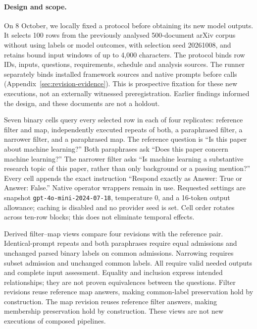 \documentclass[11pt]{article}
\begin{document}
\paragraph{Design and scope.}
On 8 October, we locally fixed a protocol before obtaining its new model
outputs. It selects 100 rows from the previously analysed 500-document
arXiv corpus without using labels or model outcomes, with selection seed
20261008, and retains bound input windows of up to 4,000 characters. The protocol binds
row IDs, inputs, questions, requirements, schedule and analysis sources.
The runner separately binds installed framework sources and native prompts
before calls (Appendix~\ref{sec:revision-evidence}). This is prospective
fixation for these new executions, not an externally witnessed
preregistration. Earlier findings informed the design, and these documents
are not a holdout.

Seven binary cells query every selected row in each of four replicates:
reference filter and map, independently executed repeats of both, a
paraphrased filter, a narrower filter, and a paraphrased map. The reference
question is ``Is this paper about machine learning?'' Both paraphrases ask
``Does this paper concern machine learning?'' The narrower filter asks
``Is machine learning a substantive research topic of this paper, rather
than only background or a passing mention?'' Every cell appends the exact
instruction ``Respond exactly as Answer: True or Answer: False.'' Native
operator wrappers remain in use. Requested settings are snapshot
\texttt{gpt-4o-mini-2024-07-18}, temperature 0, and a 16-token output allowance;
caching is disabled and no provider seed is set. Cell order rotates
across ten-row blocks; this does not eliminate temporal effects.

Derived filter--map views compare four revisions with the reference pair.
Identical-prompt repeats and both paraphrases require equal admissions and
unchanged parsed binary labels on common admissions. Narrowing requires subset
admission and unchanged common labels. All require valid needed outputs and
complete input assessment. Equality and inclusion express intended
relationships; they are not proven equivalences between the questions.
Filter revisions reuse reference map answers, making common-label
preservation hold by construction. The map revision reuses reference filter
answers, making membership preservation hold by construction. These views
are not new executions of composed pipelines.
\end{document}
